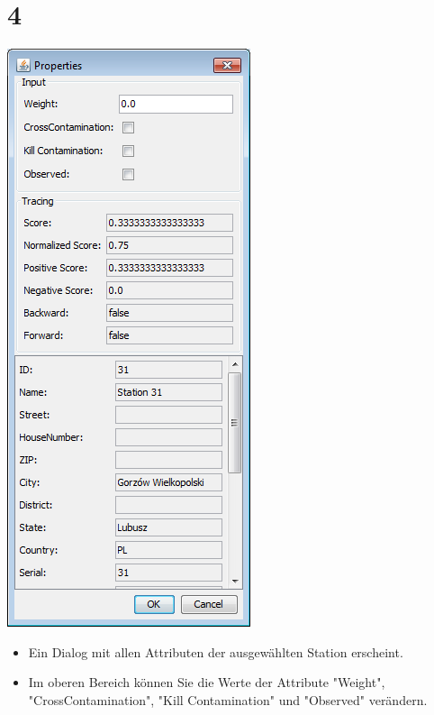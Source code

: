 \documentclass{beamer}
\begin{document}
\section{4}
\begin{frame}
	\begin{center}
  		\includegraphics[height=0.6\textheight]{4.png}
	\end{center}
	\begin{itemize}
		\item Ein Dialog mit allen Attributen der ausgewählten Station erscheint.
		\item Im oberen Bereich können Sie die Werte der Attribute "Weight", "CrossContamination", "Kill Contamination" und "Observed" verändern.		
	\end{itemize}
\end{frame}
\end{document}
